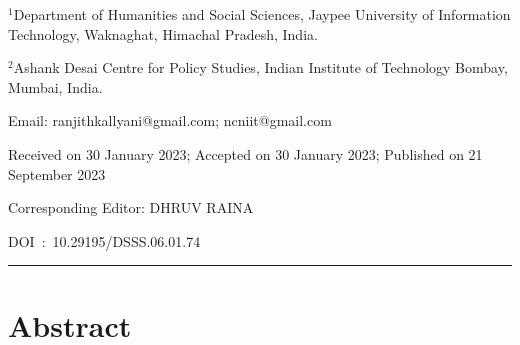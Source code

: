 \documentclass[twoside, 13pt]{article}
\begin{document}


\maketitle
  


\noindent



\vspace{-.5cm}

$^{1}$Department of Humanities and Social Sciences, Jaypee University of Information Technology, Waknaghat, Himachal Pradesh, India.
       
$^{2}$Ashank Desai Centre for Policy Studies, Indian Institute of Technology Bombay, Mumbai, India.

Email: ranjithkallyani@gmail.com; ncniit@gmail.com 

\vspace{.3cm}

Received on 30 January 2023; Accepted on 30 January 2023; Published on 21 September 2023

\vspace{.3cm}

Corresponding Editor: DHRUV RAINA

\vspace{.3cm}

DOI~:~10.29195/DSSS.06.01.74

\noindent\rule{\textwidth}{0.2mm}


\vspace{-.7cm}


{\fontsize{18}{20}\selectfont \section*{Abstract}}

\vspace{-.4cm}
\end{document}
